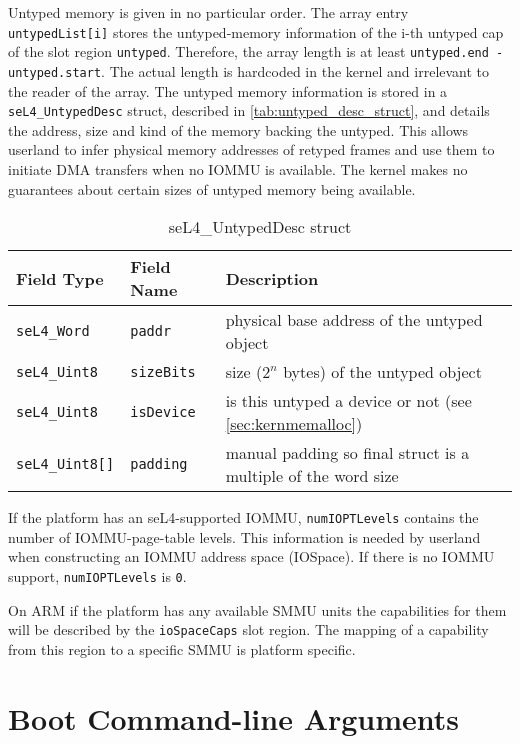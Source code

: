 Untyped memory is given in no particular order. The array entry
\texttt{untypedList[i]} stores the untyped-memory information of
the i-th untyped cap of the slot region \texttt{untyped}. Therefore, the array
length is at least \texttt{untyped.end - untyped.start}. The actual length is
hardcoded in the kernel and irrelevant to the reader of the array. The untyped
memory information is stored in a \texttt{seL4\_UntypedDesc} struct, described
in \autoref{tab:untyped_desc_struct}, and details the address, size and kind of
the memory backing the untyped. This allows userland to infer physical memory
addresses of retyped frames and use them to initiate DMA transfers when no
IOMMU is available. The kernel makes no guarantees about certain sizes of untyped
memory being available.

\begin{table}[htb]
  \begin{center}
    \caption{seL4\_UntypedDesc struct}
    \label{tab:untyped_desc_struct}
    \begin{tabular}{lll}
      \toprule
      Field Type & Field Name & Description \\
      \midrule
      \texttt{seL4\_Word}  & \texttt{paddr}    & physical base address of the untyped object \\
      \texttt{seL4\_Uint8} & \texttt{sizeBits} & size ($2^n$ bytes) of the untyped object \\
      \texttt{seL4\_Uint8} & \texttt{isDevice} & is this untyped a device or not (see \autoref{sec:kernmemalloc}) \\
      \texttt{seL4\_Uint8[]} & \texttt{padding} & manual padding so final struct is a multiple of the word size \\
      \bottomrule
    \end{tabular}
  \end{center}
\end{table}

If the platform has an seL4-supported IOMMU, \texttt{numIOPTLevels} contains
the number of IOMMU-page-table levels. This information is needed by userland
when constructing an IOMMU address space (IOSpace). If there is no IOMMU
support, \texttt{numIOPTLevels} is \texttt{0}.

On ARM if the platform has any available SMMU units the capabilities for them
will be described by the \texttt{ioSpaceCaps} slot region. The mapping of a
capability from this region to a specific SMMU is platform specific.

\ifxeightsix
\section{Boot Command-line Arguments}

